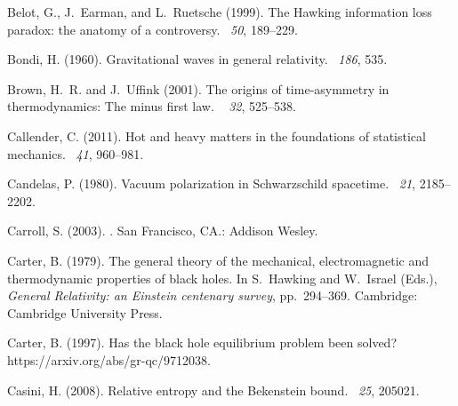 \documentclass[12pt]{article}
\begin{document}
\begin{thebibliography}{}
Belot, G., J.~Earman, and L.~Ruetsche (1999).
\newblock The {H}awking information loss paradox: the anatomy of a controversy.
~{\em 50},
  189--229.

Bondi, H. (1960).
\newblock Gravitational waves in general relativity.
~{\em 186}, 535.

Brown, H.~R. and J.~Uffink (2001).
\newblock The origins of time-asymmetry in thermodynamics: The minus first law.
~{\em
  32}, 525--538.

Callender, C. (2011).
\newblock Hot and heavy matters in the foundations of statistical mechanics.
~{\em 41}, 960--981.

Candelas, P. (1980).
\newblock Vacuum polarization in {S}chwarzschild spacetime.
~{\em 21}, 2185--2202.

Carroll, S. (2003).
.
\newblock San Francisco, CA.: Addison Wesley.

Carter, B. (1979).
\newblock The general theory of the mechanical, electromagnetic and
  thermodynamic properties of black holes.
\newblock In S.~Hawking and W.~Israel (Eds.), {\em General Relativity: an
  {E}instein centenary survey}, pp.\  294--369. Cambridge: Cambridge University
  Press.

Carter, B. (1997).
\newblock Has the black hole equilibrium problem been solved?
\newblock https://arxiv.org/abs/gr-qc/9712038.

Casini, H. (2008).
\newblock Relative entropy and the {B}ekenstein bound.
~{\em 25}, 205021.


\end{thebibliography}
\end{document}
